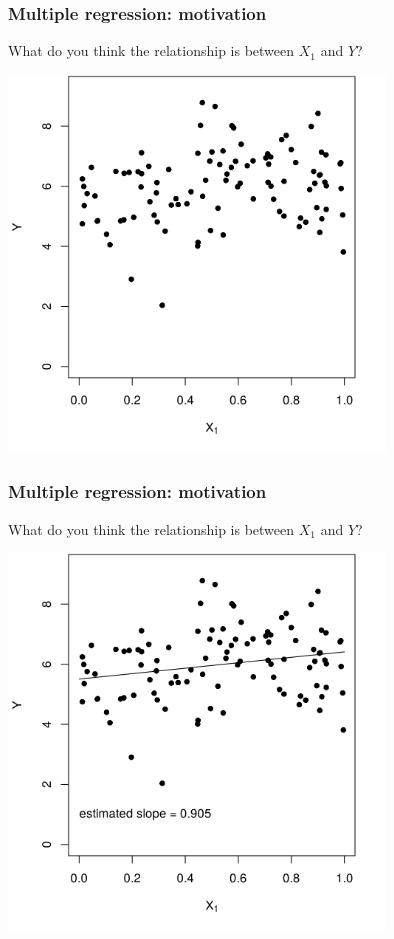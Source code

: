 \documentclass[12pt, 
hyperref={colorlinks=true, linkcolor=blue, urlcolor=cyan}]{beamer}
\begin{document}
\begin{frame}
\frametitle{Multiple regression: motivation}
What do you think the relationship is between $X_1$ and $Y$?

\vspace{-0.3cm}
\centering
\includegraphics[width = 0.75\textwidth]{./plots/confounding_simple.png}
\end{frame}

\begin{frame}
\frametitle{Multiple regression: motivation}
What do you think the relationship is between $X_1$ and $Y$?

\vspace{-0.3cm}

\centering
\includegraphics[width = 0.75\textwidth]{./plots/confounding_simple_with_line.png}
\end{frame}
\end{document}
